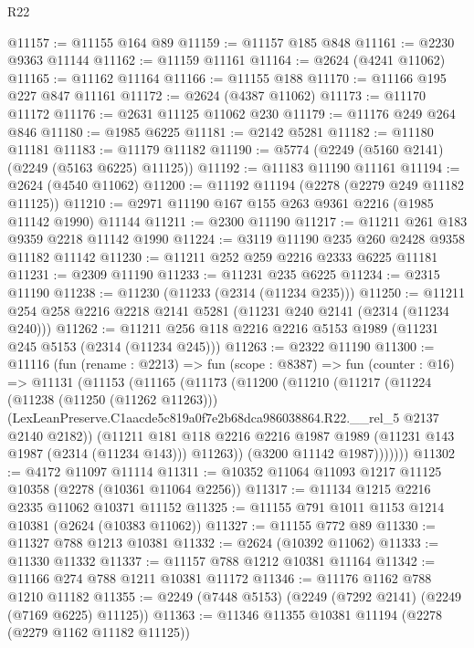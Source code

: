 \begin{lexlean}{R22}
\begin{coremodule}
@11157 := @11155 @164 @89
@11159 := @11157 @185 @848
@11161 := @2230 @9363 @11144
@11162 := @11159 @11161
@11164 := @2624 (@4241 @11062)
@11165 := @11162 @11164
@11166 := @11155 @188
@11170 := @11166 @195 @227 @847 @11161
@11172 := @2624 (@4387 @11062)
@11173 := @11170 @11172
@11176 := @2631 @11125 @11062 @230
@11179 := @11176 @249 @264 @846
@11180 := @1985 @6225
@11181 := @2142 @5281
@11182 := @11180 @11181
@11183 := @11179 @11182
@11190 := @5774 (@2249 (@5160 @2141) (@2249 (@5163 @6225) @11125))
@11192 := @11183 @11190 @11161
@11194 := @2624 (@4540 @11062)
@11200 := @11192 @11194 (@2278 (@2279 @249 @11182 @11125))
@11210 := @2971 @11190 @167 @155 @263 @9361 @2216 (@1985 @11142 @1990) @11144
@11211 := @2300 @11190
@11217 := @11211 @261 @183 @9359 @2218 @11142 @1990
@11224 := @3119 @11190 @235 @260 @2428 @9358 @11182 @11142
@11230 := @11211 @252 @259 @2216 @2333 @6225 @11181
@11231 := @2309 @11190
@11233 := @11231 @235 @6225
@11234 := @2315 @11190
@11238 := @11230 (@11233 (@2314 (@11234 @235)))
@11250 := @11211 @254 @258 @2216 @2218 @2141 @5281 (@11231 @240 @2141 (@2314 (@11234 @240)))
@11262 := @11211 @256 @118 @2216 @2216 @5153 @1989 (@11231 @245 @5153 (@2314 (@11234 @245)))
@11263 := @2322 @11190
@11300 := @11116
    (fun (rename : @2213) =>
    fun (scope : @8387) =>
    fun (counter : @16) =>
    @11131
      (@11153
        (@11165
          (@11173
            (@11200
              (@11210
                (@11217
                  (@11224
                    (@11238 (@11250 (@11262 @11263)))
                    (LexLeanPreserve.C1aacde5c819a0f7e2b68dca986038864.R22.__rel_5
                      @2137
                      @2140
                      @2182))
                  (@11211
                    @181
                    @118
                    @2216
                    @2216
                    @1987
                    @1989
                    (@11231 @143 @1987 (@2314 (@11234 @143)))
                    @11263))
                (@3200 @11142 @1987)))))))
@11302 := @4172 @11097 @11114
@11311 := @10352 @11064 @11093 @1217 @11125 @10358 (@2278 (@10361 @11064 @2256))
@11317 := @11134 @1215 @2216 @2335 @11062 @10371 @11152
@11325 := @11155 @791 @1011 @1153 @1214 @10381 (@2624 (@10383 @11062))
@11327 := @11155 @772 @89
@11330 := @11327 @788 @1213 @10381
@11332 := @2624 (@10392 @11062)
@11333 := @11330 @11332
@11337 := @11157 @788 @1212 @10381 @11164
@11342 := @11166 @274 @788 @1211 @10381 @11172
@11346 := @11176 @1162 @788 @1210 @11182
@11355 := @2249 (@7448 @5153) (@2249 (@7292 @2141) (@2249 (@7169 @6225) @11125))
@11363 := @11346 @11355 @10381 @11194 (@2278 (@2279 @1162 @11182 @11125))

\end{coremodule}
\end{lexlean}
